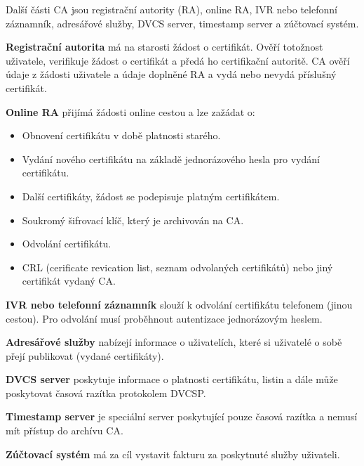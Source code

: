 \vspace{0,3cm}
\noindent Další části CA jsou registrační autority (RA), online RA, IVR nebo telefonní záznamník, adresářové služby, DVCS server, timestamp server a zúčtovací systém.

\textbf{Registrační autorita} má na starosti žádost o certifikát. Ověří totožnost uživatele, verifikuje žádost o certifikát a předá ho certifikační autoritě. CA ověří údaje z žádosti uživatele a údaje doplněné RA a vydá nebo nevydá příslušný certifikát.
 
\textbf{Online RA} přijímá žádosti online cestou a lze zažádat o:
\begin{itemize}[noitemsep]
    \item Obnovení certifikátu v době platnosti starého.
    \item Vydání nového certifikátu na základě jednorázového hesla pro vydání certifikátu.
    \item Další certifikáty, žádost se podepisuje platným certifikátem.
    \item Soukromý šifrovací klíč, který je archivován na CA.
    \item Odvolání certifikátu.
    \item CRL (cerificate revication list, seznam odvolaných certifikátů) nebo jiný certifikát vydaný CA.
\end{itemize}

\textbf{IVR nebo telefonní záznamník} slouží k odvolání certifikátu telefonem (jinou cestou). Pro odvolání musí proběhnout autentizace jednorázovým heslem.

\textbf{Adresářové služby} nabízejí informace o uživatelích, které si uživatelé o sobě přejí publikovat (vydané certifikáty).

\textbf{DVCS server} poskytuje informace o platnosti certifikátu, listin a dále může poskytovat časová razítka protokolem DVCSP.

\textbf{Timestamp server} je speciální server poskytující pouze časová razítka a nemusí mít přístup do archívu CA.

\textbf{Zúčtovací systém} má za cíl vystavit fakturu za poskytnuté služby uživateli.

